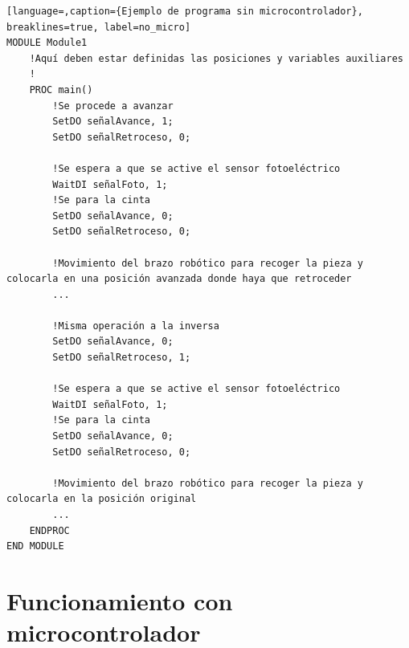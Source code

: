 \begin{lstlisting}[language=,caption={Ejemplo de programa sin microcontrolador}, breaklines=true, label=no_micro]
MODULE Module1
    !Aquí deben estar definidas las posiciones y variables auxiliares
    !
    PROC main()
        !Se procede a avanzar 
        SetDO señalAvance, 1;
        SetDO señalRetroceso, 0;

        !Se espera a que se active el sensor fotoeléctrico
        WaitDI señalFoto, 1;
        !Se para la cinta
        SetDO señalAvance, 0;
        SetDO señalRetroceso, 0;
        
        !Movimiento del brazo robótico para recoger la pieza y colocarla en una posición avanzada donde haya que retroceder
        ...

        !Misma operación a la inversa
        SetDO señalAvance, 0;
        SetDO señalRetroceso, 1;

        !Se espera a que se active el sensor fotoeléctrico
        WaitDI señalFoto, 1;
        !Se para la cinta
        SetDO señalAvance, 0;
        SetDO señalRetroceso, 0;

        !Movimiento del brazo robótico para recoger la pieza y colocarla en la posición original
        ...
    ENDPROC
END MODULE
\end{lstlisting}

\section{Funcionamiento con microcontrolador}
